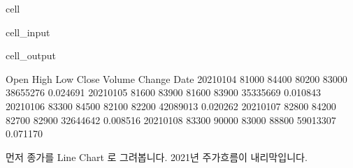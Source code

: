 \documentclass[letterpaper,10pt,english]{jupyterBook}
\begin{document}
\begin{sphinxuseclass}{cell}\begin{sphinxVerbatimInput}

\begin{sphinxuseclass}{cell_input}
\begin{sphinxVerbatim}[commandchars=\\\{\}]
    
   

   
     

\end{sphinxVerbatim}

\end{sphinxuseclass}\end{sphinxVerbatimInput}
\begin{sphinxVerbatimOutput}

\begin{sphinxuseclass}{cell_output}
\begin{sphinxVerbatim}[commandchars=\\\{\}]
             Open   High    Low  Close    Volume    Change
Date                                                      
2021\PYGZhy{}01\PYGZhy{}04  81000  84400  80200  83000  38655276  0.024691
2021\PYGZhy{}01\PYGZhy{}05  81600  83900  81600  83900  35335669  0.010843
2021\PYGZhy{}01\PYGZhy{}06  83300  84500  82100  82200  42089013 \PYGZhy{}0.020262
2021\PYGZhy{}01\PYGZhy{}07  82800  84200  82700  82900  32644642  0.008516
2021\PYGZhy{}01\PYGZhy{}08  83300  90000  83000  88800  59013307  0.071170
\end{sphinxVerbatim}

\end{sphinxuseclass}\end{sphinxVerbatimOutput}

\end{sphinxuseclass}
\sphinxAtStartPar
먼저 종가를 Line Chart 로 그려봅니다. 2021년 주가흐름이 내리막입니다.
\end{document}
